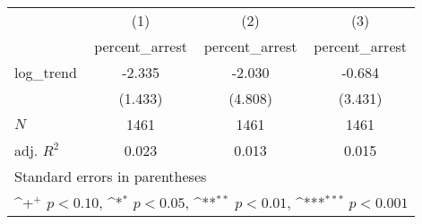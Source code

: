 {
\def\sym#1{\ifmmode^{#1}\else\(^{#1}\)\fi}
\begin{tabular}{l*{3}{c}}
\hline\hline
            &\multicolumn{1}{c}{(1)}&\multicolumn{1}{c}{(2)}&\multicolumn{1}{c}{(3)}\\
            &\multicolumn{1}{c}{percent\_arrest}&\multicolumn{1}{c}{percent\_arrest}&\multicolumn{1}{c}{percent\_arrest}\\
\hline
log\_trend   &      -2.335         &      -2.030         &      -0.684         \\
            &     (1.433)         &     (4.808)         &     (3.431)         \\
\hline
\(N\)       &        1461         &        1461         &        1461         \\
adj. \(R^{2}\)&       0.023         &       0.013         &       0.015         \\
\hline\hline
\multicolumn{4}{l}{\footnotesize Standard errors in parentheses}\\
\multicolumn{4}{l}{\footnotesize \sym{+} \(p<0.10\), \sym{*} \(p<0.05\), \sym{**} \(p<0.01\), \sym{***} \(p<0.001\)}\\
\end{tabular}
}
